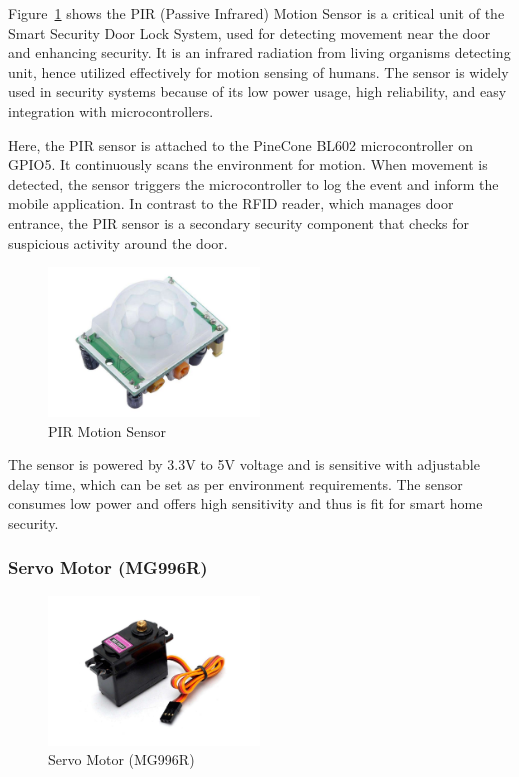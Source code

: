 \documentclass[a4paper]{scrartcl}
\begin{document}
Figure~\ref{fig:PIR} shows the PIR (Passive Infrared)\cite{PIRMotion} Motion Sensor is a critical unit of the Smart Security Door Lock System, used for detecting movement near the door and enhancing security. It is an infrared radiation from living organisms detecting unit, hence utilized effectively for motion sensing of humans. The sensor is widely used in security systems because of its low power usage, high reliability, and easy integration with microcontrollers.

Here, the PIR sensor is attached to the PineCone BL602 microcontroller on GPIO5. It continuously scans the environment for motion. When movement is detected, the sensor triggers the microcontroller to log the event and inform the mobile application. In contrast to the RFID reader, which manages door entrance, the PIR sensor is a secondary security component that checks for suspicious activity around the door.
\begin{figure}[H] %
    \centering
    \includegraphics[width=0.5\textwidth]{PIR.pdf}
    \caption{PIR Motion Sensor}
    \label{fig:PIR}
\end{figure}
The sensor is powered by 3.3V to 5V voltage and is sensitive with adjustable delay time, which can be set as per environment requirements. The sensor consumes low power and offers high sensitivity and thus is fit for smart home security.


\subsubsection{Servo Motor (MG996R)}

\begin{figure}[H] %
    \centering
    \includegraphics[width=0.5\textwidth]{motor.pdf}
    \caption{Servo Motor (MG996R)}
    \label{fig:motor}
\end{figure}
\end{document}
